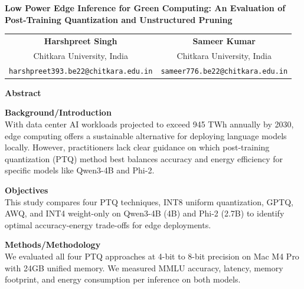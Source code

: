 \documentclass[12pt]{article}
\begin{document}
\begin{center}
    \Large\textbf{Low Power Edge Inference for Green Computing: An Evaluation of Post-Training Quantization and Unstructured Pruning}
\end{center}

\vspace{12pt}

\begin{center}
\begin{tabular}{cc}
\textbf{Harshpreet Singh} & \textbf{Sameer Kumar}\\[3pt]
Chitkara University, India & Chitkara University, India\\[3pt]
\texttt{harshpreet393.be22@chitkara.edu.in} & \texttt{sameer776.be22@chitkara.edu.in}
\end{tabular}
\end{center}

\vspace{18pt}

\begin{center}
    \textbf{Abstract}
\end{center}

\vspace{6pt}

\noindent\textbf{Background/Introduction}\\
With data center AI workloads projected to exceed 945 TWh annually by 2030, edge computing offers a sustainable alternative for deploying language models locally. However, practitioners lack clear guidance on which post-training quantization (PTQ) method best balances accuracy and energy efficiency for specific models like Qwen3-4B and Phi-2.

\vspace{12pt}

\noindent\textbf{Objectives}\\
This study compares four PTQ techniques, INT8 uniform quantization, GPTQ, AWQ, and INT4 weight-only on Qwen3-4B (4B) and Phi-2 (2.7B) to identify optimal accuracy-energy trade-offs for edge deployments.

\vspace{12pt}

\noindent\textbf{Methods/Methodology}\\
We evaluated all four PTQ approaches at 4-bit to 8-bit precision on Mac M4 Pro with 24GB unified memory. We measured MMLU accuracy, latency, memory footprint, and energy consumption per inference on both models.
\end{document}
